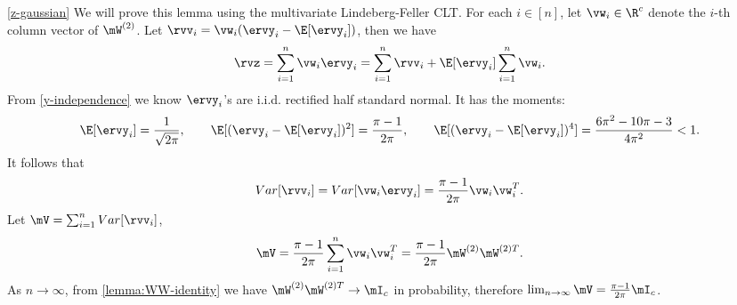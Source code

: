 \begin{proofof}{\cref{z-gaussian}}
We will prove this lemma using the multivariate Lindeberg-Feller CLT.
For each $i\in[n]$, let $\vw_i\in\R^c$ denote the $i$-th column vector of $\mW^{(2)}$. Let 
$\rvv_i = \vw_i(\ervy_i - \E[\ervy_i])$,
then we have \begin{equation}
\label{eqn:z-expression}
    \rvz = \sum_{i=1}^n\vw_i\ervy_i = \sum_{i=1}^n\rvv_i + \E[\ervy_i]\sum_{i=1}^n\vw_i.
\end{equation}
From \cref{y-independence} we know $\ervy_i$'s are i.i.d. rectified half standard normal. It has the moments:
\begin{equation}
    \E[\ervy_i] = \frac{1}{\sqrt{2\pi}},\qquad \E[(\ervy_i - \E[\ervy_i])^2] = \frac{\pi-1}{2\pi},\qquad \E[(\ervy_i - \E[\ervy_i])^4] = \frac{6\pi^2-10\pi-3}{4\pi^2} < 1.
\end{equation}
It follows that 
\begin{equation}
   Var[\rvv_i] = Var[\vw_i\ervy_i] = \frac{\pi-1}{2\pi}\vw_i\vw_i^T.
\end{equation}
Let $\mV = \sum_{i=1}^n Var[\rvv_i]$,
\begin{equation}
    \mV = \frac{\pi-1}{2\pi}\sum_{i=1}^n\vw_i\vw_i^T = \frac{\pi-1}{2\pi}\mW^{(2)}\mW^{(2)T}.
\end{equation}
As $n\to\infty$, from \cref{lemma:WW-identity} we have $\mW^{(2)}\mW^{(2)T}\to \mI_c$ in probability, therefore $\lim_{n\to\infty}\mV = \frac{\pi-1}{2\pi}\mI_c$.


\end{proofof}
